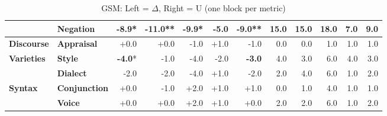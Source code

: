 \begin{table}[h]
{\begin{tabular}{llrrrrrrrrrr}
  & \textbf{Negation} & \cellcolor{red!17} \textbf{-8.9}* & \cellcolor{red!20} \textbf{-11.0}** & \cellcolor{red!19} \textbf{-9.9}* & \cellcolor{red!9} \textbf{-5.0} & \cellcolor{red!17} \textbf{-9.0}** & \cellcolor{blue!3} 15.0 & \cellcolor{blue!3} 15.0 & \cellcolor{blue!3} 18.0 & \cellcolor{blue!1} 7.0 & \cellcolor{blue!1} 9.0 \\
\midrule
\textbf{Discourse} & \textbf{Appraisal} & \cellcolor{red!0} +0.0 & \cellcolor{red!0} +0.0 & \cellcolor{red!1} -1.0 & \cellcolor{green!1} +1.0 & \cellcolor{red!1} -1.0 & \cellcolor{blue!0} 0.0 & \cellcolor{blue!0} 0.0 & \cellcolor{blue!0} 1.0 & \cellcolor{blue!0} 1.0 & \cellcolor{blue!0} 1.0 \\
\midrule
\textbf{Varieties} & \textbf{Style} & \cellcolor{red!7} \textbf{-4.0}* & \cellcolor{red!1} -1.0 & \cellcolor{red!7} -4.0 & \cellcolor{red!3} -2.0 & \cellcolor{red!5} \textbf{-3.0} & \cellcolor{blue!0} 4.0 & \cellcolor{blue!0} 3.0 & \cellcolor{blue!1} 6.0 & \cellcolor{blue!0} 4.0 & \cellcolor{blue!0} 3.0 \\
  & \textbf{Dialect} & \cellcolor{red!3} -2.0 & \cellcolor{red!3} -2.0 & \cellcolor{red!7} -4.0 & \cellcolor{green!1} +1.0 & \cellcolor{red!3} -2.0 & \cellcolor{blue!0} 2.0 & \cellcolor{blue!0} 4.0 & \cellcolor{blue!1} 6.0 & \cellcolor{blue!0} 1.0 & \cellcolor{blue!0} 2.0 \\
\midrule
\textbf{Syntax} & \textbf{Conjunction} & \cellcolor{red!0} +0.0 & \cellcolor{red!1} -1.0 & \cellcolor{green!3} +2.0 & \cellcolor{green!1} +1.0 & \cellcolor{green!1} +1.0 & \cellcolor{blue!0} 0.0 & \cellcolor{blue!0} 1.0 & \cellcolor{blue!0} 4.0 & \cellcolor{blue!0} 1.0 & \cellcolor{blue!0} 1.0 \\
  & \textbf{Voice} & \cellcolor{red!0} +0.0 & \cellcolor{red!0} +0.0 & \cellcolor{green!3} +2.0 & \cellcolor{green!1} +1.0 & \cellcolor{red!0} +0.0 & \cellcolor{blue!0} 2.0 & \cellcolor{blue!0} 2.0 & \cellcolor{blue!1} 6.0 & \cellcolor{blue!0} 1.0 & \cellcolor{blue!0} 2.0 \\
\bottomrule
\end{tabular}}
\caption{GSM: Left = $\Delta$, Right = U (one block per metric)}\label{tab:gsm_dual}
\end{table}